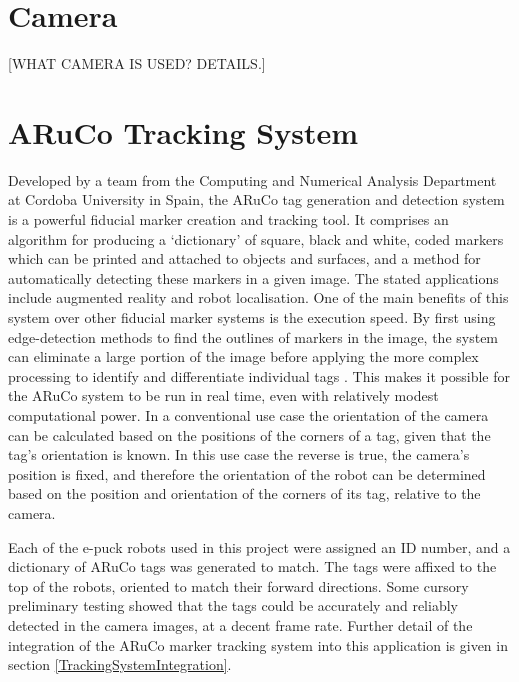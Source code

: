 
\section{Camera}
[WHAT CAMERA IS USED? DETAILS.]



\section{ARuCo Tracking System}
Developed by a team from the Computing and Numerical Analysis Department at Cordoba University in Spain, the ARuCo tag generation and detection system \cite{Garrido:2014} is a powerful fiducial marker creation and tracking tool. It comprises an algorithm for producing a `dictionary' of square, black and white, coded markers which can be printed and attached to objects and surfaces, and a method for automatically detecting these markers in a given image. The stated applications include augmented reality and robot localisation. One of the main benefits of this system over other fiducial marker systems is the execution speed. By first using edge-detection methods to find the outlines of markers in the image, the system can eliminate a large portion of the image before applying the more complex processing to identify and differentiate individual tags \cite{Garrido:2014}. This makes it possible for the ARuCo system to be run in real time, even with relatively modest computational power. In a conventional use case the orientation of the camera can be calculated based on the positions of the corners of a tag, given that the tag's orientation is known. In this use case the reverse is true, the camera's position is fixed, and therefore the orientation of the robot can be determined based on the position and orientation of the corners of its tag, relative to the camera. 

Each of the e-puck robots used in this project were assigned an ID number, and a dictionary of ARuCo tags was generated to match. The tags were affixed to the top of the robots, oriented to match their forward directions. Some cursory preliminary testing showed that the tags could be accurately and reliably detected in the camera images, at a decent frame rate. Further detail of the integration of the ARuCo marker tracking system into this application is given in section \ref{TrackingSystemIntegration}.

